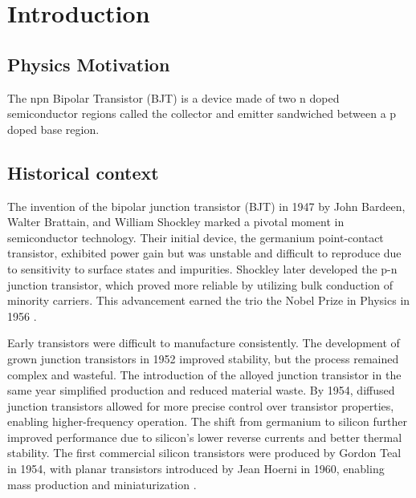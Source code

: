 \documentclass[12pt,letterpaper,onecolumn]{article}
\begin{document}

\section{Introduction}

\subsection{Physics Motivation}

The npn Bipolar Transistor (BJT) is a device made of two n doped semiconductor regions called the collector and emitter sandwiched between a p doped base region. 


\subsection{Historical context}


The invention of the bipolar junction transistor (BJT) in 1947 by John Bardeen, Walter Brattain, and William Shockley marked a pivotal moment in semiconductor technology. Their initial device, the germanium point-contact transistor, exhibited power gain but was unstable and difficult to reproduce due to sensitivity to surface states and impurities. Shockley later developed the p-n junction transistor, which proved more reliable by utilizing bulk conduction of minority carriers. This advancement earned the trio the Nobel Prize in Physics in 1956 \cite{Lukasiak}.

Early transistors were difficult to manufacture consistently. The development of grown junction transistors in 1952 improved stability, but the process remained complex and wasteful. The introduction of the alloyed junction transistor in the same year simplified production and reduced material waste. By 1954, diffused junction transistors allowed for more precise control over transistor properties, enabling higher-frequency operation. The shift from germanium to silicon further improved performance due to silicon's lower reverse currents and better thermal stability. The first commercial silicon transistors were produced by Gordon Teal in 1954, with planar transistors introduced by Jean Hoerni in 1960, enabling mass production and miniaturization \cite{Lukasiak}.
\end{document}
